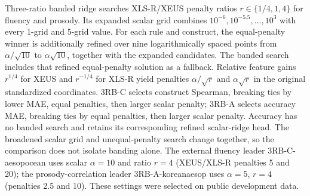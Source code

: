 \documentclass[10pt]{article}
\begin{document}
Three-ratio banded ridge searches XLS-R/XEUS penalty ratios $r\in\{1/4,1,4\}$ for fluency and prosody. Its expanded scalar grid combines $10^{-6},10^{-5.5},\ldots,10^3$ with every 1-grid and 5-grid value. For each rule and construct, the equal-penalty winner is additionally refined over nine logarithmically spaced points from $\alpha/\sqrt{10}$ to $\alpha\sqrt{10}$, together with the expanded candidates. The banded search includes that refined equal-penalty solution as a fallback. Relative feature gains $r^{1/4}$ for XEUS and $r^{-1/4}$ for XLS-R yield penalties $\alpha/\sqrt r$ and $\alpha\sqrt r$ in the original standardized coordinates. 3RB-C selects construct Spearman, breaking ties by lower MAE, equal penalties, then larger scalar penalty; 3RB-A selects accuracy MAE, breaking ties by equal penalties, then larger scalar penalty. Accuracy has no banded search and retains its corresponding refined scalar-ridge head. The broadened scalar grid and unequal-penalty search change together, so the comparison does not isolate banding alone. The external fluency leader 3RB-C-aesopocean uses scalar $\alpha=10$ and ratio $r=4$ (XEUS/XLS-R penalties 5 and 20); the prosody-correlation leader 3RB-A-koreanaesop uses $\alpha=5$, $r=4$ (penalties 2.5 and 10). These settings were selected on public development data.
\end{document}
